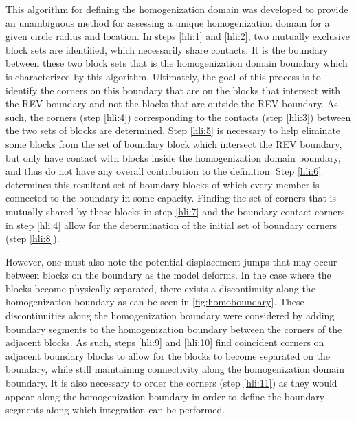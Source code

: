 
This algorithm for defining the homogenization domain was developed
to provide an unambiguous method for assessing a unique homogenization
domain for a given circle radius and location. In steps \ref{hli:1}
and \ref{hli:2}, two mutually exclusive block sets are identified,
which necessarily share contacts. It is the boundary between these
two block sets that is the homogenization domain boundary which is
characterized by this algorithm. Ultimately, the goal of this process
is to identify the corners on this boundary that are on the blocks
that intersect with the REV boundary and not the blocks that are outside
the REV boundary. As such, the corners (step \ref{hli:4}) corresponding
to the contacts (step \ref{hli:3}) between the two sets of blocks
are determined. Step \ref{hli:5} is necessary to help eliminate some
blocks from the set of boundary block which intersect the REV boundary,
but only have contact with blocks inside the homogenization domain
boundary, and thus do not have any overall contribution to the definition.
Step \ref{hli:6} determines this resultant set of boundary blocks
of which every member is connected to the boundary in some capacity.
Finding the set of corners that is mutually shared by these blocks
in step \ref{hli:7} and the boundary contact corners in step \ref{hli:4}
allow for the determination of the initial set of boundary corners
(step \ref{hli:8}).

However, one must also note the potential displacement jumps that
may occur between blocks on the boundary as the model deforms. In
the case where the blocks become physically separated, there exists
a discontinuity along the homogenization boundary as can be seen in
\ref{fig:homoboundary}. These discontinuities along the homogenization
boundary were considered by adding boundary segments to the homogenization
boundary between the corners of the adjacent blocks. As such, steps
\ref{hli:9} and \ref{hli:10} find coincident corners on adjacent
boundary blocks to allow for the blocks to become separated on the
boundary, while still maintaining connectivity along the homogenization
domain boundary. It is also necessary to order the corners (step \ref{hli:11})
as they would appear along the homogenization boundary in order to
define the boundary segments along which integration can be performed.
